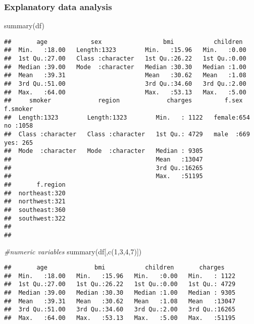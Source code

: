 \documentclass[
]{article}
\newenvironment{Shaded}{\begin{snugshade}}{\end{snugshade}}
\newcommand{\CommentTok}[1]{\textcolor[rgb]{0.56,0.35,0.01}{\textit{#1}}}
\newcommand{\DecValTok}[1]{\textcolor[rgb]{0.00,0.00,0.81}{#1}}
\newcommand{\FunctionTok}[1]{\textcolor[rgb]{0.00,0.00,0.00}{#1}}
\newcommand{\NormalTok}[1]{#1}
\begin{document}
\hypertarget{explanatory-data-analysis}{%
\subsubsection{Explanatory data
analysis}\label{explanatory-data-analysis}}

\begin{Shaded}
\begin{Highlighting}[]
\FunctionTok{summary}\NormalTok{(df)}
\end{Highlighting}
\end{Shaded}

\begin{verbatim}
##       age            sex                 bmi           children   
##  Min.   :18.00   Length:1323        Min.   :15.96   Min.   :0.00  
##  1st Qu.:27.00   Class :character   1st Qu.:26.22   1st Qu.:0.00  
##  Median :39.00   Mode  :character   Median :30.30   Median :1.00  
##  Mean   :39.31                      Mean   :30.62   Mean   :1.08  
##  3rd Qu.:51.00                      3rd Qu.:34.60   3rd Qu.:2.00  
##  Max.   :64.00                      Max.   :53.13   Max.   :5.00  
##     smoker             region             charges         f.sex     f.smoker  
##  Length:1323        Length:1323        Min.   : 1122   female:654   no :1058  
##  Class :character   Class :character   1st Qu.: 4729   male  :669   yes: 265  
##  Mode  :character   Mode  :character   Median : 9305                          
##                                        Mean   :13047                          
##                                        3rd Qu.:16265                          
##                                        Max.   :51195                          
##       f.region  
##  northeast:320  
##  northwest:321  
##  southeast:360  
##  southwest:322  
##                 
## 
\end{verbatim}

\begin{Shaded}
\begin{Highlighting}[]
\CommentTok{\#numeric variables}
\FunctionTok{summary}\NormalTok{(df[,}\FunctionTok{c}\NormalTok{(}\DecValTok{1}\NormalTok{,}\DecValTok{3}\NormalTok{,}\DecValTok{4}\NormalTok{,}\DecValTok{7}\NormalTok{)]) }
\end{Highlighting}
\end{Shaded}

\begin{verbatim}
##       age             bmi           children       charges     
##  Min.   :18.00   Min.   :15.96   Min.   :0.00   Min.   : 1122  
##  1st Qu.:27.00   1st Qu.:26.22   1st Qu.:0.00   1st Qu.: 4729  
##  Median :39.00   Median :30.30   Median :1.00   Median : 9305  
##  Mean   :39.31   Mean   :30.62   Mean   :1.08   Mean   :13047  
##  3rd Qu.:51.00   3rd Qu.:34.60   3rd Qu.:2.00   3rd Qu.:16265  
##  Max.   :64.00   Max.   :53.13   Max.   :5.00   Max.   :51195
\end{verbatim}
\end{document}
